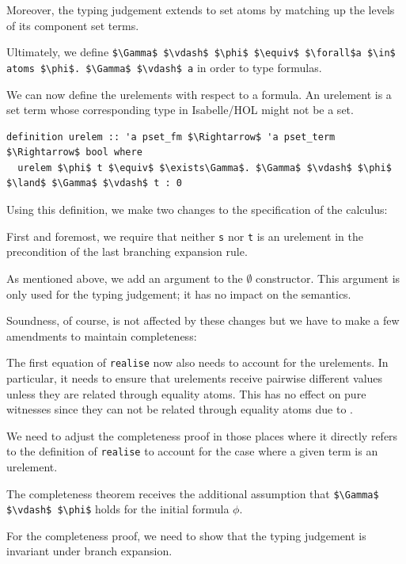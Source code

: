 \documentclass[runningheads]{llncs}
\begin{document}
Moreover, the typing judgement extends to set atoms by matching up the levels of its component set terms.

Ultimately, we define \lstinline!$\Gamma$ $\vdash$ $\phi$ $\equiv$ $\forall$a $\in$ atoms $\phi$. $\Gamma$ $\vdash$ a! in order to type formulas.

We can now define the urelements with respect to a formula.
An urelement is a set term whose corresponding type in Isabelle/HOL might not be a set.
\begin{lstlisting}
definition urelem :: 'a pset_fm $\Rightarrow$ 'a pset_term $\Rightarrow$ bool where
  urelem $\phi$ t $\equiv$ $\exists\Gamma$. $\Gamma$ $\vdash$ $\phi$ $\land$ $\Gamma$ $\vdash$ t : 0
\end{lstlisting}
Using this definition, we make two changes to the specification of the calculus: 
\begin{enumerate*}[label=(\arabic*)]
  \item First and foremost, we require that neither \lstinline!s! nor \lstinline!t! is an urelement in the precondition of the last branching expansion rule.
  \item As mentioned above, we add an argument to the $\emptyset$ constructor.
    This argument is only used for the typing judgement; it has no impact on the semantics.
\end{enumerate*}

Soundness, of course, is not affected by these changes but we have to make a few amendments to maintain completeness:
\begin{enumerate*}[label=(\arabic*)]
  \item The first equation of \lstinline!realise! now also needs to account for the urelements.
    In particular, it needs to ensure that urelements receive pairwise different values unless they are related through equality atoms. 
    This has no effect on pure witnesses since they can not be related through equality atoms due to .
  \item We need to adjust the completeness proof in those places where it directly refers to the definition of \lstinline!realise! to account for the case where a given term is an urelement.
  \item The completeness theorem receives the additional assumption that \lstinline!$\Gamma$ $\vdash$ $\phi$! holds for the initial formula $\phi$. 
  \item For the completeness proof, we need to show that the typing judgement is invariant under branch expansion.
\end{enumerate*}
\end{document}
